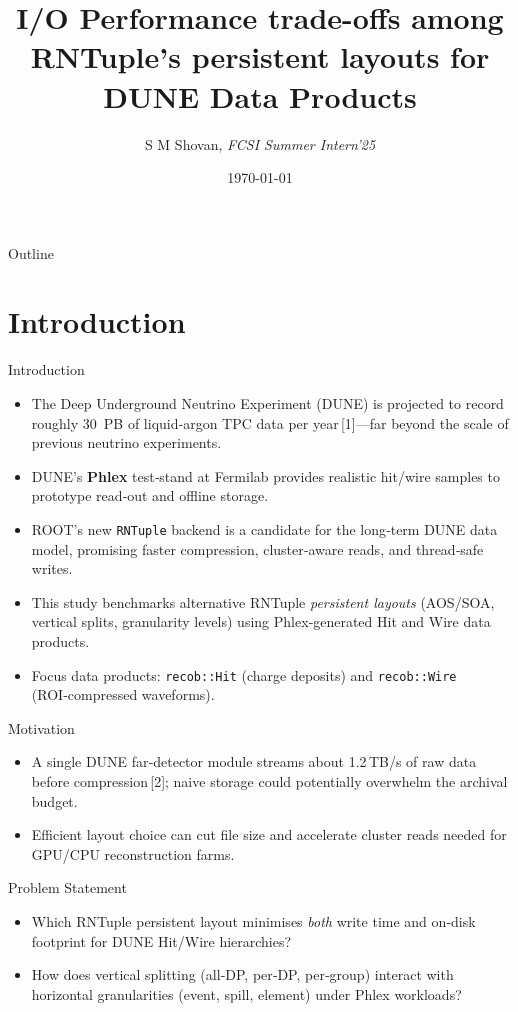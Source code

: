 \documentclass[aspectratio=169]{beamer}
\title{I/O Performance trade-offs among RNTuple’s persistent layouts for DUNE Data Products}
\subtitle{}
\author{S M Shovan, \textit{FCSI Summer Intern'25}}
\institute{Fermi National Accelerator Laboratory}
\date{\today}
\begin{document}
\maketitle


\begin{frame}{Outline}
\tableofcontents
\end{frame}

\section{Introduction}

\begin{frame}{Introduction}
  \begin{itemize}
    \item The Deep Underground Neutrino Experiment (DUNE) is projected to record roughly 30~PB of liquid‑argon TPC data per year\,[1]—far beyond the scale of previous neutrino experiments.
    \item DUNE’s \textbf{Phlex} test‑stand at Fermilab provides realistic hit/wire samples to prototype read‑out and offline storage.
    \item ROOT’s new \texttt{RNTuple} backend is a candidate for the long‑term DUNE data model, promising faster compression, cluster‑aware reads, and thread‑safe writes.
    \item This study benchmarks alternative RNTuple \emph{persistent layouts} (AOS/SOA, vertical splits, granularity levels) using Phlex‑generated Hit and Wire data products.
    \item Focus data products: \texttt{recob::Hit} (charge deposits) and \texttt{recob::Wire} (ROI‑compressed waveforms).
  \end{itemize}
\end{frame}

\begin{frame}{Motivation}
  \begin{itemize}
    \item A single DUNE far‑detector module streams about 1.2\,TB/s of raw data before compression\,[2]; naive storage could potentially overwhelm the archival budget.
    \item Efficient layout choice can cut file size and accelerate cluster reads needed for GPU/CPU reconstruction farms.
  \end{itemize}
\end{frame}

\begin{frame}{Problem Statement}
  \begin{itemize}
    \item Which RNTuple persistent layout minimises \emph{both} write time and on‑disk footprint for DUNE Hit/Wire hierarchies?
    \item How does vertical splitting (all‑DP, per‑DP, per‑group) interact with horizontal granularities (event, spill, element) under Phlex workloads?
  \end{itemize}
\end{frame}
\end{document}
